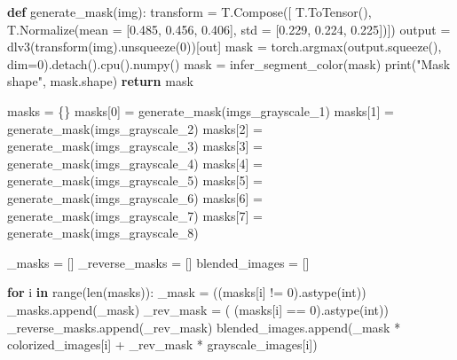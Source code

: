 \documentclass[
]{article}
\newenvironment{Shaded}{}{}
\newcommand{\BuiltInTok}[1]{#1}
\newcommand{\ControlFlowTok}[1]{\textcolor[rgb]{0.00,0.44,0.13}{\textbf{#1}}}
\newcommand{\DecValTok}[1]{\textcolor[rgb]{0.25,0.63,0.44}{#1}}
\newcommand{\FloatTok}[1]{\textcolor[rgb]{0.25,0.63,0.44}{#1}}
\newcommand{\KeywordTok}[1]{\textcolor[rgb]{0.00,0.44,0.13}{\textbf{#1}}}
\newcommand{\NormalTok}[1]{#1}
\newcommand{\OperatorTok}[1]{\textcolor[rgb]{0.40,0.40,0.40}{#1}}
\newcommand{\StringTok}[1]{\textcolor[rgb]{0.25,0.44,0.63}{#1}}
\begin{document}
\begin{Shaded}
\begin{Highlighting}[]
\KeywordTok{def}\NormalTok{ generate\_mask(img):}
\NormalTok{  transform }\OperatorTok{=}\NormalTok{ T.Compose([}
\NormalTok{                     T.ToTensor(),}
\NormalTok{                     T.Normalize(mean }\OperatorTok{=}\NormalTok{ [}\FloatTok{0.485}\NormalTok{, }\FloatTok{0.456}\NormalTok{, }\FloatTok{0.406}\NormalTok{],  std }\OperatorTok{=}\NormalTok{ [}\FloatTok{0.229}\NormalTok{, }\FloatTok{0.224}\NormalTok{, }\FloatTok{0.225}\NormalTok{])])}
\NormalTok{  output }\OperatorTok{=}\NormalTok{ dlv3(transform(img).unsqueeze(}\DecValTok{0}\NormalTok{))[}\StringTok{\textquotesingle{}out\textquotesingle{}}\NormalTok{]}
\NormalTok{  mask }\OperatorTok{=}\NormalTok{ torch.argmax(output.squeeze(), dim}\OperatorTok{=}\DecValTok{0}\NormalTok{).detach().cpu().numpy()}
\NormalTok{  mask }\OperatorTok{=}\NormalTok{ infer\_segment\_color(mask)}
  \BuiltInTok{print}\NormalTok{(}\StringTok{"Mask shape"}\NormalTok{, mask.shape)}
  \ControlFlowTok{return}\NormalTok{ mask}

\NormalTok{masks }\OperatorTok{=}\NormalTok{ \{\} }
\NormalTok{masks[}\DecValTok{0}\NormalTok{] }\OperatorTok{=}\NormalTok{ generate\_mask(imgs\_grayscale\_1)}
\NormalTok{masks[}\DecValTok{1}\NormalTok{] }\OperatorTok{=}\NormalTok{ generate\_mask(imgs\_grayscale\_2)}
\NormalTok{masks[}\DecValTok{2}\NormalTok{] }\OperatorTok{=}\NormalTok{ generate\_mask(imgs\_grayscale\_3)}
\NormalTok{masks[}\DecValTok{3}\NormalTok{] }\OperatorTok{=}\NormalTok{ generate\_mask(imgs\_grayscale\_4)}
\NormalTok{masks[}\DecValTok{4}\NormalTok{] }\OperatorTok{=}\NormalTok{ generate\_mask(imgs\_grayscale\_5)}
\NormalTok{masks[}\DecValTok{5}\NormalTok{] }\OperatorTok{=}\NormalTok{ generate\_mask(imgs\_grayscale\_6)}
\NormalTok{masks[}\DecValTok{6}\NormalTok{] }\OperatorTok{=}\NormalTok{ generate\_mask(imgs\_grayscale\_7)}
\NormalTok{masks[}\DecValTok{7}\NormalTok{] }\OperatorTok{=}\NormalTok{ generate\_mask(imgs\_grayscale\_8)}

\NormalTok{\_masks }\OperatorTok{=}\NormalTok{ []}
\NormalTok{\_reverse\_masks }\OperatorTok{=}\NormalTok{ []}
\NormalTok{blended\_images }\OperatorTok{=}\NormalTok{ []}

\ControlFlowTok{for}\NormalTok{ i }\KeywordTok{in} \BuiltInTok{range}\NormalTok{(}\BuiltInTok{len}\NormalTok{(masks)):}
\NormalTok{    \_mask }\OperatorTok{=}\NormalTok{ ((masks[i] }\OperatorTok{!=} \DecValTok{0}\NormalTok{).astype(}\BuiltInTok{int}\NormalTok{))}
\NormalTok{    \_masks.append(\_mask)}
\NormalTok{    \_rev\_mask }\OperatorTok{=}\NormalTok{  ( (masks[i] }\OperatorTok{==} \DecValTok{0}\NormalTok{).astype(}\BuiltInTok{int}\NormalTok{))}
\NormalTok{    \_reverse\_masks.append(\_rev\_mask)}
\NormalTok{    blended\_images.append(\_mask }\OperatorTok{*}\NormalTok{ colorized\_images[i] }\OperatorTok{+}\NormalTok{ \_rev\_mask }\OperatorTok{*}\NormalTok{ grayscale\_images[i])}
    

\end{Highlighting}
\end{Shaded}
\end{document}
